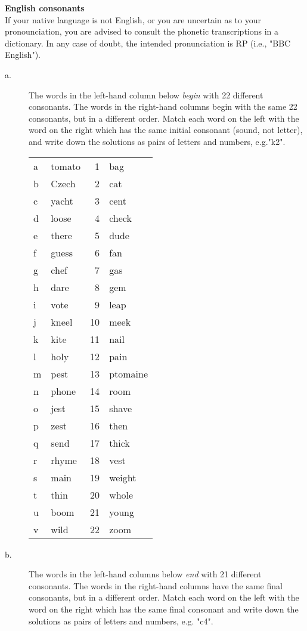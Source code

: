 \documentclass[11pt]{article}
\begin{document}
\begin{problem}{2}
\textbf{English consonants} \\
If your native language is not English, or you are uncertain as to your pronounciation, you are advised to
consult the phonetic transcriptions in a dictionary. In any case of doubt, the intended pronunciation is RP
(i.e., "BBC English"). 
\newpage

\begin{description}
	\item[a.] The words in the left-hand column below \textit{begin} with 22 different consonants. The words in the right-hand columns begin with the same 22 consonants, but in a different order. Match each word on the left with the word on the right which has the same initial consonant (sound, not letter), and write down the solutions as pairs of letters and numbers, e.g."k2".

	\begin{tabular}{l p{6cm} | r l}
		a & tomato & 1 & bag \\
		b & Czech & 2 & cat \\
		c & yacht & 3 & cent \\
		d & loose & 4 & check \\
		e & there & 5 & dude \\
		f & guess & 6 & fan \\
		g & chef & 7 & gas \\
		h & dare & 8 & gem \\
		i & vote & 9 & leap \\
		j & kneel & 10 & meek \\
		k & kite & 11 & nail \\
		l & holy & 12 & pain \\
		m & pest & 13 & ptomaine \\
		n & phone & 14 & room \\
		o & jest & 15 & shave \\
		p & zest & 16 & then \\
		q & send & 17 & thick \\
		r & rhyme & 18 & vest \\
		s & main & 19 & weight \\
		t & thin & 20 & whole \\
		u & boom & 21 & young \\
		v & wild & 22 & zoom 
	\end{tabular}
	\newpage
	\item[b.] The words in the left-hand columns below \textit{end} with 21 different consonants. The words in the right-hand columns have the same final consonants, but in a different order. Match each word on the left with the word on the right which has the same final consonant and write down the solutions as pairs of letters and numbers, e.g. "c4".
	

\end{description}
\end{problem}
\end{document}

